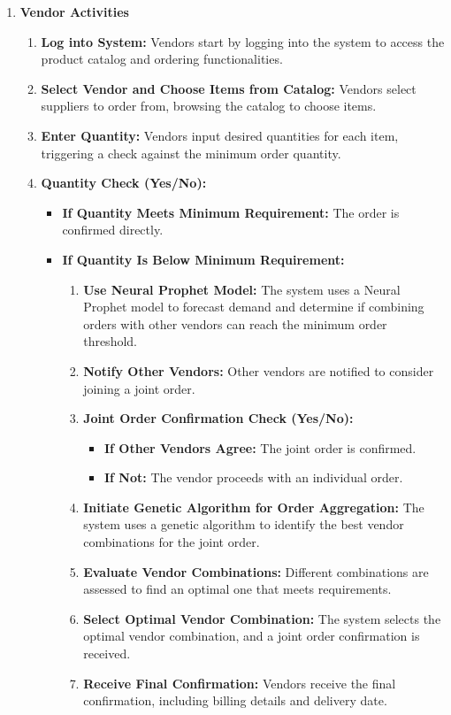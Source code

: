 \begin{enumerate}
    \item \textbf{Vendor Activities}
    \begin{enumerate}
        \item \textbf{Log into System:} Vendors start by logging into the system to access the product catalog and ordering functionalities.
        \item \textbf{Select Vendor and Choose Items from Catalog:} Vendors select suppliers to order from, browsing the catalog to choose items.
        \item \textbf{Enter Quantity:} Vendors input desired quantities for each item, triggering a check against the minimum order quantity.
        \item \textbf{Quantity Check (Yes/No):}
        \begin{itemize}
            \item \textbf{If Quantity Meets Minimum Requirement:} The order is confirmed directly.
            \item \textbf{If Quantity Is Below Minimum Requirement:}
            \begin{enumerate}
                \item \textbf{Use Neural Prophet Model:} The system uses a Neural Prophet model to forecast demand and determine if combining orders with other vendors can reach the minimum order threshold.
                \item \textbf{Notify Other Vendors:} Other vendors are notified to consider joining a joint order.
                \item \textbf{Joint Order Confirmation Check (Yes/No):}
                \begin{itemize}
                    \item \textbf{If Other Vendors Agree:} The joint order is confirmed.
                    \item \textbf{If Not:} The vendor proceeds with an individual order.
                \end{itemize}
                \item \textbf{Initiate Genetic Algorithm for Order Aggregation:} The system uses a genetic algorithm to identify the best vendor combinations for the joint order.
                \item \textbf{Evaluate Vendor Combinations:} Different combinations are assessed to find an optimal one that meets requirements.
                \item \textbf{Select Optimal Vendor Combination:} The system selects the optimal vendor combination, and a joint order confirmation is received.
                \item \textbf{Receive Final Confirmation:} Vendors receive the final confirmation, including billing details and delivery date.
            \end{enumerate}
        \end{itemize}
    \end{enumerate}


\end{enumerate}
